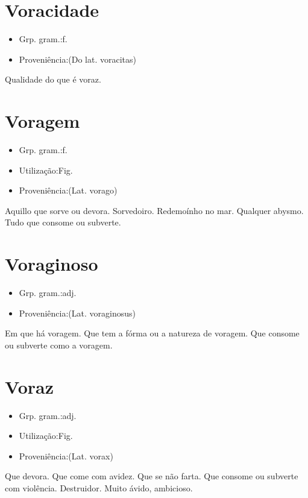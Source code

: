 \documentclass{article}
\begin{document}
\section{Voracidade}
\begin{itemize}
\item {Grp. gram.:f.}
\end{itemize}
\begin{itemize}
\item {Proveniência:(Do lat. \textunderscore voracitas\textunderscore )}
\end{itemize}
Qualidade do que é voraz.
\section{Voragem}
\begin{itemize}
\item {Grp. gram.:f.}
\end{itemize}
\begin{itemize}
\item {Utilização:Fig.}
\end{itemize}
\begin{itemize}
\item {Proveniência:(Lat. \textunderscore vorago\textunderscore )}
\end{itemize}
Aquillo que sorve ou devora.
Sorvedoiro.
Redemoínho no mar.
Qualquer abysmo.
Tudo que consome ou subverte.
\section{Voraginoso}
\begin{itemize}
\item {Grp. gram.:adj.}
\end{itemize}
\begin{itemize}
\item {Proveniência:(Lat. \textunderscore voraginosus\textunderscore )}
\end{itemize}
Em que há voragem.
Que tem a fórma ou a natureza de voragem.
Que consome ou subverte como a voragem.
\section{Voraz}
\begin{itemize}
\item {Grp. gram.:adj.}
\end{itemize}
\begin{itemize}
\item {Utilização:Fig.}
\end{itemize}
\begin{itemize}
\item {Proveniência:(Lat. \textunderscore vorax\textunderscore )}
\end{itemize}
Que devora.
Que come com avidez.
Que se não farta.
Que consome ou subverte com violência.
Destruidor.
Muito ávido, ambicioso.
\end{document}
